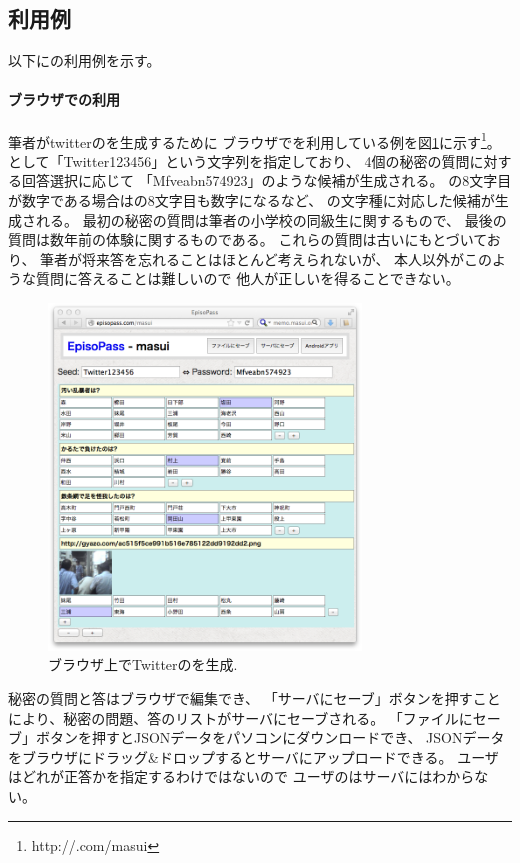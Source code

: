 \documentclass[twoside]{wiss}
\begin{document}
\subsection{{\EP}利用例}

以下に{\EP}の利用例を示す。

\paragraph{ブラウザでの利用}

筆者がtwitterの{\PW}を生成するために
ブラウザで{\EP}を利用している例を図\ref{web1}に示す\footnote{
  \textsf{http://{\EP}.com/masui}
}。
{\SS}として「\textsf{Twitter123456}」という文字列を指定しており、
4個の秘密の質問に対する回答選択に応じて
「\textsf{Mfveabn574923}」のような{\PW}候補が生成される。
{\SS}の8文字目が数字である場合は{\PW}の8文字目も数字になるなど、
{\SS}の文字種に対応した{\PW}候補が生成される。
最初の秘密の質問は筆者の小学校の同級生に関するもので、
最後の質問は数年前の体験に関するものである。
これらの質問は古い{\EM}にもとづいており、
筆者が将来答を忘れることはほとんど考えられないが、
本人以外がこのような質問に答えることは難しいので
他人が正しい{\PW}を得ることできない。

\begin{figure}[H]
\centerline{\includegraphics[width=83mm,bb=0 0 718 796]{figures/785ff09b4233804d2ec89c3af71ee5d0.png}}
\caption{ブラウザ上でTwitterの{\PW}を生成.}
\label{web1}
\end{figure}

秘密の質問と答はブラウザで編集でき、
「サーバにセーブ」ボタンを押すことにより{\SS}、秘密の問題、答のリストがサーバにセーブされる。
「ファイルにセーブ」ボタンを押すとJSONデータをパソコンにダウンロードでき、
JSONデータをブラウザにドラッグ\&ドロップするとサーバにアップロードできる。
ユーザはどれが正答かを指定するわけではないので
ユーザの{\PW}はサーバにはわからない。
\end{document}
